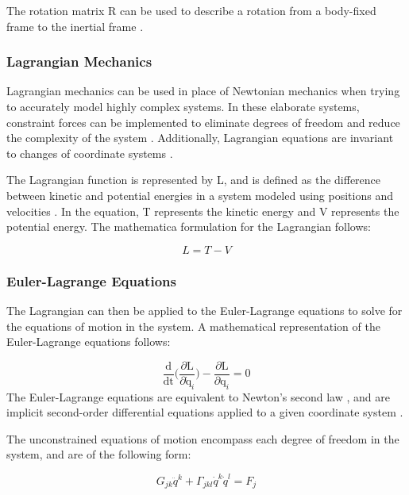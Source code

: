The rotation matrix R can be used to describe a rotation from a body-fixed frame to the inertial frame \cite{VTOL}.

\subsubsection{Lagrangian Mechanics}

Lagrangian mechanics can be used in place of Newtonian mechanics when trying to accurately model highly complex systems.
In these elaborate systems, constraint forces can be implemented to eliminate degrees of freedom and reduce the complexity of the system \cite{LagrangeEquations}. Additionally, Lagrangian equations are invariant to changes of coordinate systems \cite{LagrangePowerpoint}.
\par
The Lagrangian function is represented by L, and is defined as the difference between kinetic and potential energies in a system modeled using positions and velocities \cite{NonholonomicPowerpoint}.
In the equation, T represents the kinetic energy and V represents the potential energy.
The mathematica formulation for the Lagrangian follows:

\begin{equation}
\label{eq:Lagrange}
L = T - V
\end{equation}

\subsubsection{Euler-Lagrange Equations}

The Lagrangian can then be applied to the Euler-Lagrange equations to solve for the equations of motion in the system. 
A mathematical representation of the Euler-Lagrange equations follows:

\begin{equation}
\label{eq:EL}
\frac{\text{d}}{\text{dt}} \bigg(\frac{\partial \text{L}}{\partial \dot{\text{q}}_{i}}\bigg) - \frac{\partial \text{L}}{\partial \text{q}_{i}} = 0
\end{equation}
The Euler-Lagrange equations are equivalent to Newton's second law \cite{NonholonomicPowerpoint}, and are implicit second-order differential equations applied to a given coordinate system \cite{Lewis}.
\par
The unconstrained equations of motion encompass each degree of freedom in the system, and are of the following form:

\begin{equation}
\label{eq:UEOM}
G_{jk} \ddot{q}^k + \Gamma_{jkl} \dot{q}^k\dot{q}^l  = F_{j}
\end{equation}

